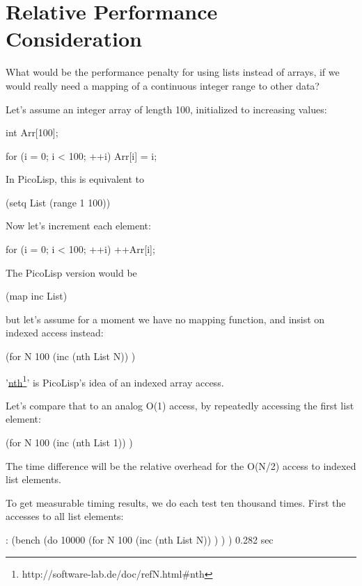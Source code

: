 \section{Relative Performance Consideration}
\label{sec:array-abst-relative-performance-consideration}

What would be the performance penalty for using lists instead of arrays, if we
would really need a mapping of a continuous integer range to other data?

Let's assume an integer array of length 100, initialized to increasing values:
\begin{wideverbatim}
   int Arr[100];

   for (i = 0; i < 100; ++i)
      Arr[i] = i;
\end{wideverbatim}

In PicoLisp, this is equivalent to
\begin{wideverbatim}
   (setq List (range 1 100))
\end{wideverbatim}


Now let's increment each element:
\begin{wideverbatim}
   for (i = 0; i < 100; ++i)
      ++Arr[i];
\end{wideverbatim}

The PicoLisp version would be
\begin{wideverbatim}
   (map inc List)
\end{wideverbatim}

but let's assume for a moment we have no mapping function, and insist on
indexed access instead:
\begin{wideverbatim}
   (for N 100
      (inc (nth List N)) )
\end{wideverbatim}

'\underline{nth}\footnote{http://software-lab.de/doc/refN.html\#nth}' is PicoLisp's idea of an
indexed array access.

Let's compare that to an analog O(1) access, by repeatedly accessing the
first list element:
\begin{wideverbatim}
   (for N 100
      (inc (nth List 1)) )
\end{wideverbatim}

The time difference will be the relative overhead for the O(N/2) access to
indexed list elements.

To get measurable timing results, we do each test ten thousand times. First the
accesses to all list elements:
\begin{wideverbatim}
   : (bench
      (do 10000
         (for N 100
            (inc (nth List N)) ) ) )
   0.282 sec
\end{wideverbatim}


